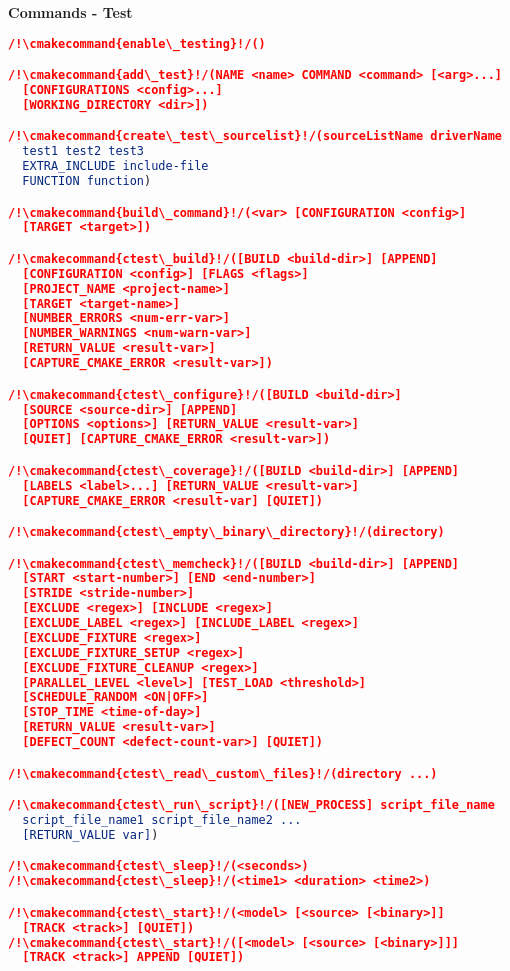 \documentclass{article}
\newcommand{\cmakecommand}[1]{{\href{https://cmake.org/cmake/help/v3.13/command/#1.html}{#1}}}
\begin{document}
\begin{minipage}[t]{0.18\linewidth}
\textbf{Commands - Test}
\begin{lstlisting}[language=CMake]
/!\cmakecommand{enable\_testing}!/()

/!\cmakecommand{add\_test}!/(NAME <name> COMMAND <command> [<arg>...]
  [CONFIGURATIONS <config>...]
  [WORKING_DIRECTORY <dir>])

/!\cmakecommand{create\_test\_sourcelist}!/(sourceListName driverName
  test1 test2 test3
  EXTRA_INCLUDE include-file
  FUNCTION function)

/!\cmakecommand{build\_command}!/(<var> [CONFIGURATION <config>]
  [TARGET <target>])

/!\cmakecommand{ctest\_build}!/([BUILD <build-dir>] [APPEND]
  [CONFIGURATION <config>] [FLAGS <flags>]
  [PROJECT_NAME <project-name>]
  [TARGET <target-name>]
  [NUMBER_ERRORS <num-err-var>]
  [NUMBER_WARNINGS <num-warn-var>]
  [RETURN_VALUE <result-var>]
  [CAPTURE_CMAKE_ERROR <result-var>])

/!\cmakecommand{ctest\_configure}!/([BUILD <build-dir>]
  [SOURCE <source-dir>] [APPEND]
  [OPTIONS <options>] [RETURN_VALUE <result-var>]
  [QUIET] [CAPTURE_CMAKE_ERROR <result-var>])

/!\cmakecommand{ctest\_coverage}!/([BUILD <build-dir>] [APPEND]
  [LABELS <label>...] [RETURN_VALUE <result-var>]
  [CAPTURE_CMAKE_ERROR <result-var] [QUIET])

/!\cmakecommand{ctest\_empty\_binary\_directory}!/(directory)

/!\cmakecommand{ctest\_memcheck}!/([BUILD <build-dir>] [APPEND]
  [START <start-number>] [END <end-number>]
  [STRIDE <stride-number>]
  [EXCLUDE <regex>] [INCLUDE <regex>]
  [EXCLUDE_LABEL <regex>] [INCLUDE_LABEL <regex>]
  [EXCLUDE_FIXTURE <regex>]
  [EXCLUDE_FIXTURE_SETUP <regex>]
  [EXCLUDE_FIXTURE_CLEANUP <regex>]
  [PARALLEL_LEVEL <level>] [TEST_LOAD <threshold>]
  [SCHEDULE_RANDOM <ON|OFF>]
  [STOP_TIME <time-of-day>]
  [RETURN_VALUE <result-var>]
  [DEFECT_COUNT <defect-count-var>] [QUIET])

/!\cmakecommand{ctest\_read\_custom\_files}!/(directory ...)

/!\cmakecommand{ctest\_run\_script}!/([NEW_PROCESS] script_file_name
  script_file_name1 script_file_name2 ...
  [RETURN_VALUE var])

/!\cmakecommand{ctest\_sleep}!/(<seconds>)
/!\cmakecommand{ctest\_sleep}!/(<time1> <duration> <time2>)

/!\cmakecommand{ctest\_start}!/(<model> [<source> [<binary>]]
  [TRACK <track>] [QUIET])
/!\cmakecommand{ctest\_start}!/([<model> [<source> [<binary>]]]
  [TRACK <track>] APPEND [QUIET])


\end{lstlisting}
\end{minipage}
\end{document}
